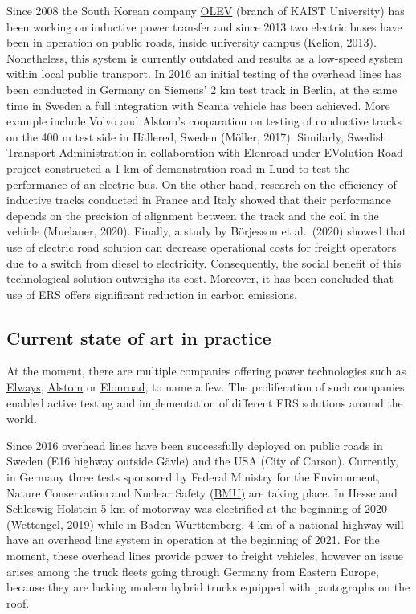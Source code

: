 \documentclass[
]{book}
\begin{document}
Since 2008 the South Korean company \href{https://www.kaist.ac.kr/en/html/kaist/01200103.html}{OLEV} (branch of KAIST University) has been working on inductive power transfer and since 2013 two electric buses have been in operation on public roads, inside university campus (Kelion, 2013). Nonetheless, this system is currently outdated and results as a low-speed system within local public transport. In 2016 an initial testing of the overhead lines has been conducted in Germany on Siemens' 2 km test track in Berlin, at the same time in Sweden a full integration with Scania vehicle has been achieved. More example include Volvo and Alstom's cooparation on testing of conductive tracks on the 400 m test side in Hällered, Sweden (Möller, 2017). Similarly, Swedish Transport Administration in collaboration with Elonroad under \href{https://www.evolutionroad.se/en/}{EVolution Road} project constructed a 1 km of demonstration road in Lund to test the performance of an electric bus.
On the other hand, research on the efficiency of inductive tracks conducted in France and Italy showed that their performance depends on the precision of alignment between the track and the coil in the vehicle (Muelaner, 2020). Finally, a study by Börjesson et al.~(2020) showed that use of electric road solution can decrease operational costs for freight operators due to a switch from diesel to electricity. Consequently, the social benefit of this technological solution outweighs its cost. Moreover, it has been concluded that use of ERS offers significant reduction in carbon emissions.

\hypertarget{current-state-of-art-in-practice-1}{%
\subsection*{Current state of art in practice}\label{current-state-of-art-in-practice-1}}

At the moment, there are multiple companies offering power technologies such as \href{https://elways.se/}{Elways}, \href{https://www.alstom.com/}{Alstom} or \href{https://elonroad.com/}{Elonroad}, to name a few. The proliferation of such companies enabled active testing and implementation of different ERS solutions around the world.

Since 2016 overhead lines have been successfully deployed on public roads in Sweden (E16 highway outside Gävle) and the USA (City of Carson). Currently, in Germany three tests sponsored by Federal Ministry for the Environment, Nature Conservation and Nuclear Safety \href{www.bmu.de}{(BMU)} are taking place. In Hesse and Schleswig-Holstein 5 km of motorway was electrified at the beginning of 2020 (Wettengel, 2019) while in Baden-Württemberg, 4 km of a national highway will have an overhead line system in operation at the beginning of 2021. For the moment, these overhead lines provide power to freight vehicles, however an issue arises among the truck fleets going through Germany from Eastern Europe, because they are lacking modern hybrid trucks equipped with pantographs on the roof.
\end{document}
